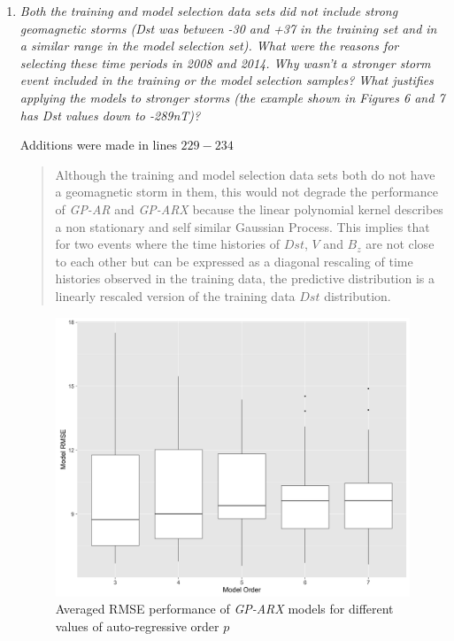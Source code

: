 \documentclass{article}
\begin{document}
\begin{enumerate}
\newpage
\item \emph{Both the training and model selection data sets did not include strong geomagnetic storms (Dst was between -30 and +37 in the training set and in a similar range in the model selection set).
What were the reasons for selecting these time periods in 2008 and 2014.
Why wasn't a stronger storm event included in the training or the model selection samples?
What justifies applying the models to stronger storms (the example shown in Figures 6 and 7 has Dst values down to -289nT)?} 

Additions were made in lines $229-234$ \blockquote{Although the training and model selection data sets both do not have a geomagnetic storm in them, this would not degrade the performance of \emph{GP-AR} and \emph{GP-ARX} because the linear polynomial kernel describes a non stationary and self similar Gaussian Process. This implies that for two events where the time histories of $Dst$, $V$ and $B_z$ are not close to each other but can be expressed as a diagonal rescaling of time histories observed in the training data, the predictive distribution is a linearly rescaled version of the training data $Dst$ distribution.}


\begin{figure}
   \centering
   \includegraphics[width=\textwidth]{Model_RMSE_validationStorms}
      \caption{Averaged RMSE performance of \emph{GP-ARX} models for different values of auto-regressive order $p$}
         \label{fig:prmse}
 \end{figure}



\end{enumerate}
\end{document}

